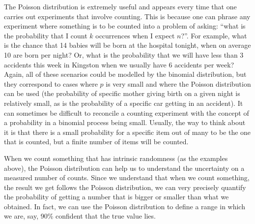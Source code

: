 

The Poisson distribution is extremely useful and appears every time that one carries out experiments that involve counting. This is because one can phrase any experiment where something is to be counted into a problem of asking: ``what is the probability that I count $k$ occurrences when I expect $n$?''. For example, what is the chance that 14 babies will be born at the hospital tonight, when on average 10 are born per night? Or, what is the probability that we will have less than 3 accidents this week in Kingston when we usually have 6 accidents per week? Again, all of these scenarios could be modelled by the binomial distribution, but they correspond to cases where $p$ is very small and where the Poisson distribution can be used (the probability of specific mother giving birth on a given night is relatively small, as is the probability of a specific car getting in an accident). It can sometimes be difficult to reconcile a counting experiment with the concept of a probability in a binomial process being small. Usually, the way to think about it is that there is a small probability for a specific item out of many to be the one that is counted, but a finite number of items will be counted. 

When we count something that has intrinsic randomness (as the examples above), the Poisson distribution can help us to understand the uncertainty on a measured number of counts. Since we understand that when we count something, the result we get follows the Poisson distribution, we can very precisely quantify the probability of getting a number that is bigger or smaller than what we obtained. In fact, we can use the Poisson distribution to define a range in which we are, say, 90\% confident that the true value lies.

